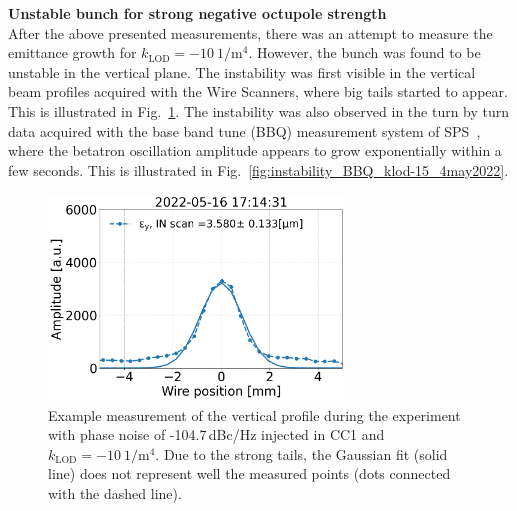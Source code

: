 \textbf{Unstable bunch for strong negative octupole strength}\\
After the above presented measurements, there was an attempt to measure the emittance growth for $k_\mathrm{LOD}=-10 \ \mathrm{1/m^4}$. However, the bunch was found to be unstable in the vertical plane. The instability was first visible in the vertical beam profiles acquired with the Wire Scanners, where big tails started to appear. This is illustrated in Fig.~\ref{fig:instability_vertical_ws}. The instability was also observed in the turn by turn data acquired with the base band tune (BBQ) measurement system of SPS~\cite{Boccardi:1055568}, where the betatron oscillation amplitude appears to grow exponentially within a few seconds. This is illustrated in Fig.~\ref{fig:instability_BBQ_klod-15_4may2022}.

\begin{figure}[!h]
   \centering         
   \includegraphics[width=0.7\textwidth]{images/Ch8/instability_41678.V_IN_OUT_ 17_14_31.png}
       \caption{Example measurement of the vertical profile during the experiment with phase noise of -104.7\,dBc/Hz injected in CC1 and $k_\mathrm{LOD}=-10 \ \mathrm{1/m^4}$. Due to the strong tails, the Gaussian fit (solid line) does not represent well the measured points (dots connected with the dashed line).}
       \label{fig:instability_vertical_ws}
\end{figure}


